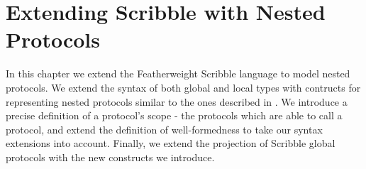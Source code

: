 \documentclass[12pt,twoside]{report}
\begin{document}


\chapter{Extending Scribble with Nested Protocols}\label{scribble-extensions-chapter}
In this chapter we extend the Featherweight Scribble language\cite{scribble} to model nested protocols. We extend the syntax of both global and local types with contructs for representing nested protocols similar to the ones described in \cite{nestedprotocols}. We introduce a precise definition of a protocol's scope - the protocols which are able to call a protocol, and extend the definition of well-formedness to take our syntax extensions into account. Finally, we extend the projection of Scribble global protocols with the new constructs we introduce.
\end{document}
